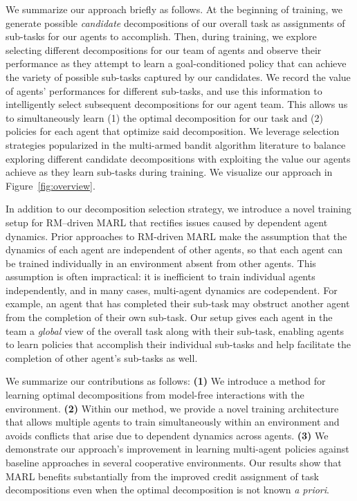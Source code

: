 We summarize our approach briefly as follows. At the beginning of training, we generate possible \textit{candidate} decompositions of our overall task as assignments of sub-tasks for our agents to accomplish. Then, during training, we explore selecting different decompositions for our team of agents and observe their performance as they attempt to learn a goal-conditioned policy that can achieve the variety of possible sub-tasks captured by our candidates. We record the value of agents' performances for different sub-tasks, and use this information to intelligently select subsequent decompositions for our agent team. This allows us to simultaneously learn (1) the optimal decomposition for our task and (2) policies for each agent that optimize said decomposition. We leverage selection strategies popularized in the multi-armed bandit algorithm literature \cite{katehakis1987multi, auer2002finite, audibert2009exploration} to balance exploring different candidate decompositions with exploiting the value our agents achieve as they learn sub-tasks during training. We visualize our approach in Figure~\ref{fig:overview}.

In addition to our decomposition selection strategy, we introduce a novel training setup for RM–driven MARL that rectifies issues caused by dependent agent dynamics. Prior approaches \cite{neary2020reward, smith2023automatic} to RM-driven MARL make the assumption that the dynamics of each agent are independent of other agents, so that each agent can be trained individually in an environment absent from other agents. This assumption is often impractical: it is inefficient to train individual agents independently, and in many cases, multi-agent dynamics are codependent. For example, an agent that has completed their sub-task may obstruct another agent from the completion of their own sub-task. Our setup gives each agent in the team a \textit{global} view of the overall task along with their sub-task, enabling agents to learn policies that accomplish their individual sub-tasks and help facilitate the completion of other agent's sub-tasks as well. 

We summarize our contributions as follows: \textbf{(1)} We introduce a method for learning optimal decompositions from model-free interactions with the environment. \textbf{(2)} Within our method, we provide a novel training architecture that allows multiple agents to train simultaneously within an environment and avoids conflicts that arise due to dependent dynamics across agents.
\textbf{(3)} We demonstrate our approach's improvement in learning multi-agent policies against baseline approaches in several cooperative environments. 
Our results show that MARL benefits substantially from the improved credit assignment of task decompositions even when the optimal decomposition is not known \textit{a priori}.%

